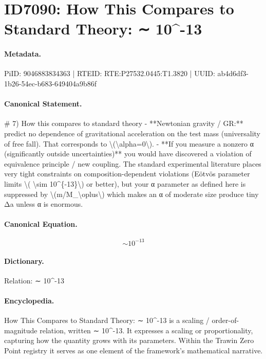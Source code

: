 \section*{ID7090: How This Compares to Standard Theory: ∼ 10\textasciicircum{}-13}
\paragraph{Metadata.}
PiID: 9046883834363 | RTEID: RTE:P27532.0445:T1.3820 | UUID: ab4d6df3-1b26-54ec-b683-649404a9b86f

\paragraph{Canonical Statement.}
\# 7) How this compares to standard theory - **Newtonian gravity / GR:** predict no dependence of gravitational acceleration on the test mass (universality of free fall). That corresponds to \textbackslash{}(\textbackslash{}alpha=0\textbackslash{}). - **If you measure a nonzero α (significantly outside uncertainties)** you would have discovered a violation of equivalence principle / new coupling. The standard experimental literature places very tight constraints on composition-dependent violations (Eötvös parameter limits \textbackslash{}( \textbackslash{}sim 10\textasciicircum{}\{-13\}\textbackslash{}) or better), but your α parameter as defined here is suppressed by \textbackslash{}(m/M\_\textbackslash{}oplus\textbackslash{}) which makes an α of moderate size produce tiny Δa unless α is enormous.

\paragraph{Canonical Equation.}
\[
\sim 10^{-13}
\]

\paragraph{Dictionary.}
Relation: ∼ 10\textasciicircum{}-13

\paragraph{Encyclopedia.}
How This Compares to Standard Theory: ∼ 10\textasciicircum{}-13 is a scaling / order-of-magnitude relation, written ∼ 10\textasciicircum{}-13. It expresses a scaling or proportionality, capturing how the quantity grows with its parameters. Within the Trawin Zero Point registry it serves as one element of the framework's mathematical narrative.
